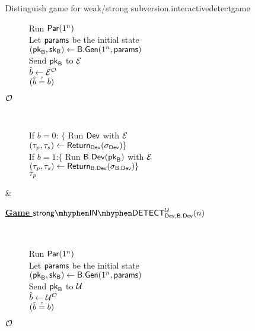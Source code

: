 \begin{defn}
\begin{enumerate}[1.]
\begin{boxfigTwo}{Distinguish game for weak/strong subversion.}{interactivedetectgame}
\begin{minipage}{0.45\textwidth}
\begin{description}
 	 	Run $\operatorname{\mathsf{Par}}(1^n)$\\
 	 	Let $\mathsf{params}$ be the initial state \\
 		$(\mathsf{pk}_{\mathsf{B}},\mathsf{sk}_{\mathsf{B}})\leftarrow \mathsf{B}.\mathsf{Gen}(1^n,\mathsf{params})$ \\
 		Send $\mathsf{pk}_{\mathsf{B}}$ to $\mathcal{E}$ \\
 		$\hat{b}\leftarrow \mathcal{E}^{\operatorname{\mathcal{O}}}$ \\
 		\Ret $\askequal{\hat{b}}{b}$

	\item[\underline{$\operatorname{\mathcal{O}}$}] ~
	
		If $b=0$: $\{$ Run $\operatorname{\mathsf{Dev}}$ with $\mathcal{E}$ \\
	    $(\tau_p,\tau_s)\leftarrow\operatorname{\mathsf{Return}}_{\operatorname{\mathsf{Dev}}}(\sigma_{\operatorname{\mathsf{Dev}}}) \}$ \\
		If $b=1$:$\{$ Run $\mathsf{B}.\mathsf{Dev}(\mathsf{pk}_{\mathsf{B}})$ with $\mathcal{E}$ \\
		$(\tau_p,\tau_s)\leftarrow\operatorname{\mathsf{Return}}_{\mathsf{B}.\mathsf{Dev}}(\sigma_{\mathsf{B}.\mathsf{Dev}}) \}$ \\
		\Ret $\tau_p$
		\smallskip
  	\end{description}
\end{minipage}
    & 
\begin{minipage}{0.45\textwidth}
    \smallskip
	\begin{description}
 	\item[\underline{\textbf{Game} $\instrongdetect{\dev}{\bbdev}{\user}$}] ~
 	
 	 	Run $\operatorname{\mathsf{Par}}(1^n)$ \\
 	 	Let $\mathsf{params}$ be the initial state \\
 		$(\mathsf{pk}_{\mathsf{B}},\mathsf{sk}_{\mathsf{B}})\leftarrow \mathsf{B}.\mathsf{Gen}(1^n,\mathsf{params})$ \\
 		Send $\mathsf{pk}_{\mathsf{B}}$ to $\mathcal{U}$ \\
 		$\hat{b}\leftarrow \mathcal{U}^{\operatorname{\mathcal{O}}}$ \\
 		\Ret $\askequal{\hat{b}}{b}$

	\item[\underline{$\operatorname{\mathcal{O}}$}] ~
	

\end{description}
\end{minipage}
\end{boxfigTwo}
\end{enumerate}
\end{defn}
